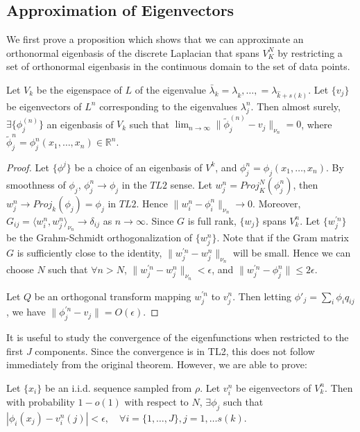 \documentclass[final]{siamart0516}
\begin{document}
\subsection{Approximation of Eigenvectors}
We first prove a proposition which shows that we can approximate an orthonormal eigenbasis of the discrete Laplacian that spans $V_K^N$ by restricting a set of orthonormal eigenbasis in the continuous domain to the set of data points.  
\begin{proposition}
Let $V_k$ be the eigenspace of $L$ of the eigenvalue $\bar{\lambda}_k = \lambda_{\hat{k}}, \dots, = \lambda_{\hat{k} + s(k)}$. Let $\{v_j\}$ be eigenvectors of $L^n$ corresponding to the eigenvalues $\lambda_j^n$. Then almost surely, $\exists \{\phi_j^{(n)}\}$ an eigenbasis of $V_k$ such that $\lim_{n\rightarrow \infty}\|\tilde{\phi}_j^{(n)} - v_j\|_{\nu_n} = 0 $, where $\tilde{\phi}_j^{n} = \phi_j^{n}(x_1, \dots, x_n) \in \mathbb{R}^n$. 
\end{proposition}
\begin{proof}
Let $\{\phi^j\}$ be a choice of an eigenbasis of $V^k$, and $\phi_j^{n} = \phi_j(x_1, \dots, x_n)$. By smoothness of $\phi_j$, $\phi_j^{n} \rightarrow \phi_j$ in the $TL2$ sense. Let $w_j^n = Proj^N_K(\phi_j^{n})$, then $w_j^n \rightarrow Proj_k(\phi_j) = \phi_j$ in $TL2$.  Hence $\|w_i^n - \phi_i^n\|_{\nu_n} \rightarrow 0$. Moreover, $G_{ij} = \langle w_i^n, w_j^n \rangle_{\nu_n} \rightarrow \delta_{ij}$ as $n\rightarrow \infty$. Since $G$ is full rank, $\{w_j\}$ spans $V^n_k$. Let $\{w_j^{'n}\}$ be the Grahm-Schmidt orthogonalization of $\{w_j^n\}$. Note that if the Gram matrix $G$ is sufficiently close to the identity, $\|w_j^{'n} - w_j^n\|_{\nu_n}$ will be small.  Hence we can choose $N$ such that $\forall n > N$, $\|w_j^{'n} - w_j^n\|_{\nu_n} < \epsilon$, and $\|w_j^{'n} - \phi_j^n\| \leq 2\epsilon$. 

Let $Q$ be an orthogonal transform mapping $w_j^{'n}$ to $v_j^n$. Then letting $\phi'_j = \sum_i \phi_i q_{ij}$, we have $\|\phi_j^{'n} - v_j\| = O(\epsilon)$. 
\end{proof}

It is useful to study the convergence of the eigenfunctions when restricted to the first $J$ components. Since the convergence is in TL2, this does not follow immediately from the original theorem. However, we are able to prove: 

\begin{proposition}
Let $\{x_i\}$ be an i.i.d. sequence sampled from $\rho$.  Let $v_i^n$ be eigenvectors of $V^n_k$. Then with probability $1 - o(1)$ with respect to $N$, $\exists \phi_j$ such that $|\phi_i(x_j) - v^n_i(j)| < \epsilon, \quad \forall i = \{1, \dots, J\}, j = 1, \dots s(k)$. 
\end{proposition}
 
\end{document}
